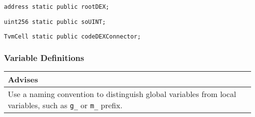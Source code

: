\begin{lstlisting}[firstnumber=18]
  address static public rootDEX;
\end{lstlisting}

\begin{lstlisting}[firstnumber=19]
  uint256 static public soUINT;
\end{lstlisting}

\begin{lstlisting}[firstnumber=20]
  TvmCell static public codeDEXConnector;
\end{lstlisting}

\subsubsection{Variable Definitions}


\ifsoldraft
\noindent\begin{tabular}{|p{12cm}|}\hline
\rowcolor{green}Advises
\\\hline
Use a naming convention to distinguish global variables from local variables, such as \verb+g_+ or \verb+m_+ prefix.
\\\hline\end{tabular}
\fi

